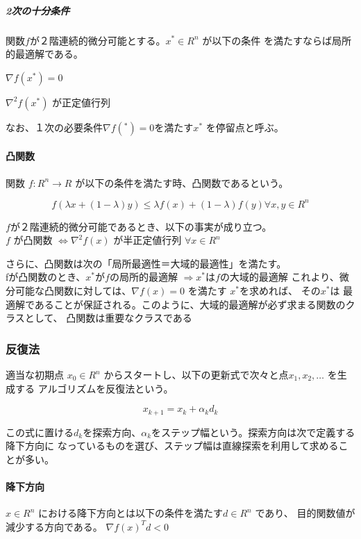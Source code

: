 \documentclass{jsarticle}
\begin{document}
\subparagraph{2次の十分条件}
関数$f$が２階連続的微分可能とする。$x^{\ast} \in R^n$ が以下の条件
を満たすならば局所的最適解である。
\begin{description}
  \item $\nabla f(x^{\ast}) = 0$
  \item ${\nabla}^2 f(x^{\ast})$ が正定値行列
\end{description}

なお、１次の必要条件$\nabla f(^{\ast}) = 0$を満たす$x^{\ast}$ を停留点と呼ぶ。


\paragraph{凸関数}
関数 $f:R^n \rightarrow R$ が以下の条件を満たす時、凸関数であるという。

$$
f(\lambda x + (1 - \lambda)y) \leq \lambda f(x) + (1 - \lambda) f(y) {\forall}x , y \in R^n
$$

$f$が２階連続的微分可能であるとき、以下の事実が成り立つ。\\

$f$ が凸関数 $\iff {\nabla}^2 f(x)$ が半正定値行列 $\forall x \in R^n$

さらに、凸関数は次の「局所最適性＝大域的最適性」を満たす。\\

fが凸関数のとき、$x^{\ast}$が$f$の局所的最適解 $\Rightarrow x^{\ast}$は$f$の大域的最適解
これより、微分可能な凸関数に対しては、$\nabla f(x) = 0$ を満たす $x^{\ast}$を求めれば、
その$x^{\ast}$は
最適解であることが保証される。このように、大域的最適解が必ず求まる関数のクラスとして、
凸関数は重要なクラスである

\subsubsection{反復法}
適当な初期点 $x_0 \in R^n$ からスタートし、以下の更新式で次々と点$x_1, x_2, \ldots$ を生成する
アルゴリズムを反復法という。

$$
x_{k+1} = x_k + {\alpha}_k d_k
$$

この式に置ける$d_k$を探索方向、$\alpha_k$をステップ幅という。探索方向は次で定義する降下方向に
なっているものを選び、ステップ幅は直線探索を利用して求めることが多い。
\paragraph{降下方向}
$x \in R^n$ における降下方向とは以下の条件を満たす$d \in R^n$ であり、
目的関数値が減少する方向である。
$\nabla f(x)^Td < 0$
\end{document}
